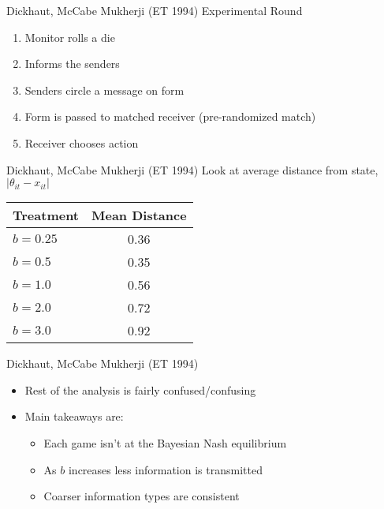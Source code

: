 \documentclass{beamer}
\begin{document}
\begin{frame}{Dickhaut, McCabe Mukherji (ET 1994)}
Experimental Round
	\begin{enumerate}
		\item Monitor rolls a die
		\item Informs the senders
		\item Senders circle a message on form
		\item Form is passed to matched receiver (pre-randomized match)
		\item Receiver chooses action
	\end{enumerate}
\end{frame}

\begin{frame}{Dickhaut, McCabe Mukherji (ET 1994)}
Look at average distance from state, $\left|\theta_{it}-x_{it}\right|$
	\begin{center}
		\begin{tabular}{lc}\hline
		Treatment &  Mean Distance \\\hline
		 $b=0.25$ &  0.36 \\
		 $b=0.5$  &  0.35 \\
		 $b=1.0$  &  0.56 \\
		 $b=2.0$  &  0.72 \\
		 $b=3.0$  &  0.92 \\\hline
		 \end{tabular}
	 \end{center}
\end{frame}

\begin{frame}{Dickhaut, McCabe Mukherji (ET 1994)}
\begin{itemize}
	\item Rest of the analysis is fairly confused/confusing
	\item Main takeaways are:
	\begin{itemize}
		\item Each game isn't at the Bayesian Nash equilibrium
		\item As $b$ increases less information is transmitted
		\item Coarser information types are consistent
	\end{itemize}
\end{itemize}
\end{frame}
\end{document}

